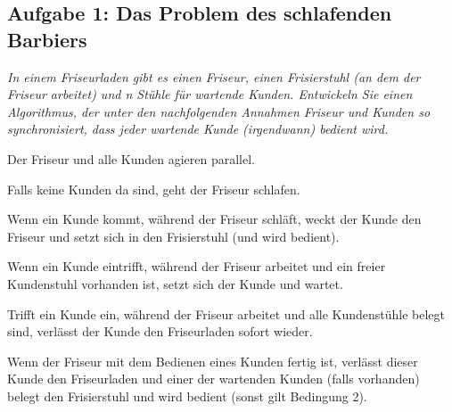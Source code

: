 \documentclass[a4paper]{article}
\begin{document}
\subsection{Aufgabe 1: Das Problem des schlafenden Barbiers}
\textit{In einem Friseurladen gibt es einen Friseur, einen Frisierstuhl (an dem der Friseur arbeitet) und n Stühle für wartende Kunden. Entwickeln Sie einen Algorithmus, der unter den nachfolgenden Annahmen Friseur und Kunden so synchronisiert, dass jeder wartende Kunde (irgendwann) bedient wird.}
\begin{itemize*}
    \item Der Friseur und alle Kunden agieren parallel.
    \item Falls keine Kunden da sind, geht der Friseur schlafen.
    \item Wenn ein Kunde kommt, während der Friseur schläft, weckt der Kunde den Friseur und setzt sich in den Frisierstuhl (und wird bedient).
    \item Wenn ein Kunde eintrifft, während der Friseur arbeitet und ein freier Kundenstuhl vorhanden ist, setzt sich der Kunde und wartet.
    \item Trifft ein Kunde ein, während der Friseur arbeitet und alle Kundenstühle belegt sind, verlässt der Kunde den Friseurladen sofort wieder.
    \item Wenn der Friseur mit dem Bedienen eines Kunden fertig ist, verlässt dieser Kunde den Friseurladen und einer der wartenden Kunden (falls vorhanden) belegt den Frisierstuhl und wird bedient (sonst gilt Bedingung 2).
\end{itemize*}
\vspace{10mm}


\end{document}
